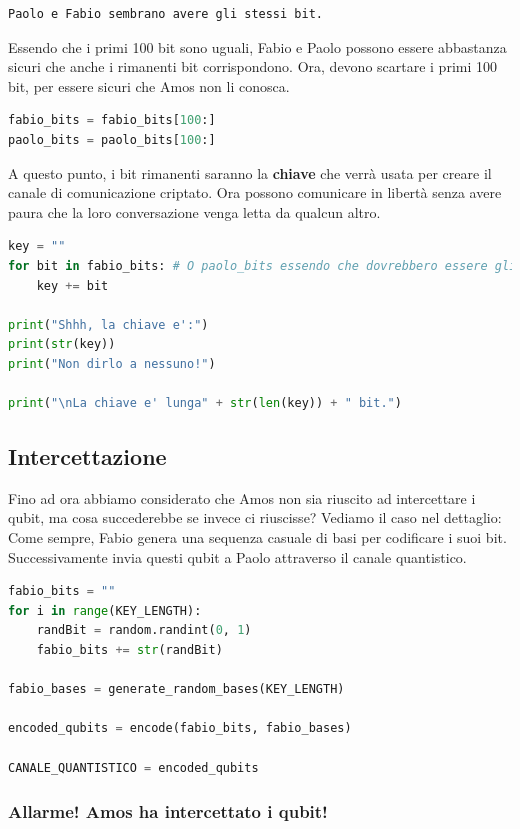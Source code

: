 \documentclass[a4paper]{article}
\begin{document}
\begin{lstlisting}[language=Python]
Paolo e Fabio sembrano avere gli stessi bit.
\end{lstlisting}
Essendo che i primi 100 bit sono uguali, Fabio e Paolo possono essere abbastanza sicuri
che anche i rimanenti bit corrispondono. Ora, devono scartare i primi 100 bit, per essere sicuri che
Amos non li conosca.
\begin{lstlisting}[language=Python]
fabio_bits = fabio_bits[100:] 
paolo_bits = paolo_bits[100:] 
\end{lstlisting}
A questo punto, i bit rimanenti saranno la \textbf{chiave} che verrà usata per creare
il canale di comunicazione criptato. Ora possono comunicare in libertà senza avere paura che la
loro conversazione venga letta da qualcun altro.
\begin{lstlisting}[language=Python]
key = "" 
for bit in fabio_bits: # O paolo_bits essendo che dovrebbero essere gli stessi.
    key += bit

print("Shhh, la chiave e':")
print(str(key))
print("Non dirlo a nessuno!")

print("\nLa chiave e' lunga" + str(len(key)) + " bit.")
\end{lstlisting}

\subsection{Intercettazione} 

Fino ad ora abbiamo considerato che Amos non sia riuscito ad intercettare i qubit, ma cosa
succederebbe se invece ci riuscisse? Vediamo il caso nel dettaglio:\\
Come sempre, Fabio genera una sequenza casuale di basi per codificare i suoi bit.
Successivamente invia questi qubit a Paolo attraverso il canale quantistico.
\begin{lstlisting}[language=Python]
fabio_bits = ""
for i in range(KEY_LENGTH):
    randBit = random.randint(0, 1) 
    fabio_bits += str(randBit) 
 
fabio_bases = generate_random_bases(KEY_LENGTH)

encoded_qubits = encode(fabio_bits, fabio_bases)

CANALE_QUANTISTICO = encoded_qubits
\end{lstlisting}

\subsubsection{Allarme! Amos ha intercettato i qubit!}
\end{document}
